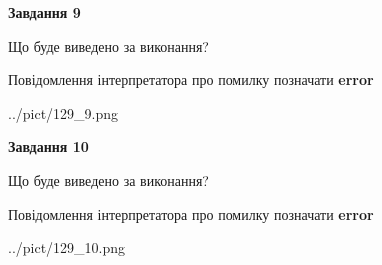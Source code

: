 \documentclass[12pt, ukrainian]{article}
\begin{document}
{{\begin {center}\textbf{Завдання 9}\end {center}}\par
Що буде виведено за виконання? \par
Повідомлення інтерпретатора про помилку позначати \textbf{error}

\begin{center}
	{../pict/129_9.png}
\end{center}
\newpage

{\begin {center}\textbf{Завдання 10}\end {center}}\par
Що буде виведено за виконання? \par
Повідомлення інтерпретатора про помилку позначати \textbf{error}

\begin{center}
	{../pict/129_10.png}
\end{center}
\newpage

}
\end{document}
